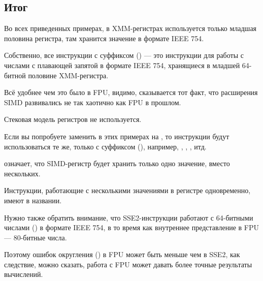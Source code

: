 \subsection{Итог}

Во всех приведенных примерах, в XMM-регистрах используется только младшая половина регистра, там
хранится значение в формате IEEE 754.

Собственно, все инструкции с суффиксом 
 () --- это инструкции для работы с числами с плавающей 
запятой в формате IEEE 754, 
хранящиеся в младшей 64-битной половине XMM-регистра.

Всё удобнее чем это было в FPU, видимо, сказывается тот факт, что расширения 
SIMD развивались не так хаотично как FPU в прошлом.

Стековая модель регистров не используется.

Если вы попробуете заменить в этих примерах \Tdouble на \Tfloat{}, 
то инструкции будут использоваться те же, только с суффиксом 
(), например, , , , итд.

 означает, что SIMD-регистр будет хранить только одно значение, вместо нескольких.

Инструкции, работающие с несколькими значениями в регистре одновременно, имеют  в названии.

Нужно также обратить внимание, что SSE2-инструкции работают с 64-битными числами (\Tdouble) в формате IEEE 754,
в то время как внутреннее представление в FPU --- 80-битные числа.

Поэтому ошибок округления () в FPU может быть меньше чем в SSE2,
как следствие, можно сказать, работа с FPU может давать более точные результаты вычислений.

